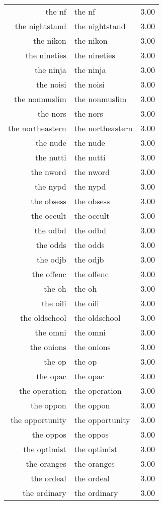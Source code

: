\begin{table}[ht]
\begin{tabular}{rlr}
  the nf & the nf & 3.00 \\ 
  the nightstand & the nightstand & 3.00 \\ 
  the nikon & the nikon & 3.00 \\ 
  the nineties & the nineties & 3.00 \\ 
  the ninja & the ninja & 3.00 \\ 
  the noisi & the noisi & 3.00 \\ 
  the nonmuslim & the nonmuslim & 3.00 \\ 
  the nors & the nors & 3.00 \\ 
  the northeastern & the northeastern & 3.00 \\ 
  the nude & the nude & 3.00 \\ 
  the nutti & the nutti & 3.00 \\ 
  the nword & the nword & 3.00 \\ 
  the nypd & the nypd & 3.00 \\ 
  the obsess & the obsess & 3.00 \\ 
  the occult & the occult & 3.00 \\ 
  the odbd & the odbd & 3.00 \\ 
  the odds & the odds & 3.00 \\ 
  the odjb & the odjb & 3.00 \\ 
  the offenc & the offenc & 3.00 \\ 
  the oh & the oh & 3.00 \\ 
  the oili & the oili & 3.00 \\ 
  the oldschool & the oldschool & 3.00 \\ 
  the omni & the omni & 3.00 \\ 
  the onions & the onions & 3.00 \\ 
  the op & the op & 3.00 \\ 
  the opac & the opac & 3.00 \\ 
  the operation & the operation & 3.00 \\ 
  the oppon & the oppon & 3.00 \\ 
  the opportunity & the opportunity & 3.00 \\ 
  the oppos & the oppos & 3.00 \\ 
  the optimist & the optimist & 3.00 \\ 
  the oranges & the oranges & 3.00 \\ 
  the ordeal & the ordeal & 3.00 \\ 
  the ordinary & the ordinary & 3.00 \\ 

\end{tabular}
\end{table}
